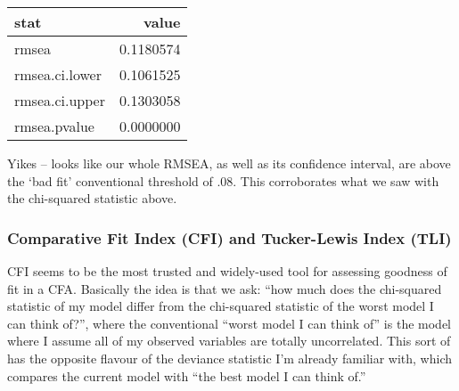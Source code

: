 \documentclass[
  letterpaper,
  DIV=11,
  numbers=noendperiod]{scrreprt}
\newenvironment{Shaded}{\begin{snugshade}}{\end{snugshade}}
\newcommand{\AttributeTok}[1]{\textcolor[rgb]{0.40,0.45,0.13}{#1}}
\newcommand{\CommentTok}[1]{\textcolor[rgb]{0.37,0.37,0.37}{#1}}
\newcommand{\FunctionTok}[1]{\textcolor[rgb]{0.28,0.35,0.67}{#1}}
\newcommand{\NormalTok}[1]{\textcolor[rgb]{0.00,0.23,0.31}{#1}}
\newcommand{\SpecialCharTok}[1]{\textcolor[rgb]{0.37,0.37,0.37}{#1}}
\newcommand{\StringTok}[1]{\textcolor[rgb]{0.13,0.47,0.30}{#1}}
\begin{document}
\begin{Shaded}
\end{Shaded}

\begin{longtable}[]{@{}lr@{}}
\toprule()
stat & value \\
\midrule()
\endhead
rmsea & 0.1180574 \\
rmsea.ci.lower & 0.1061525 \\
rmsea.ci.upper & 0.1303058 \\
rmsea.pvalue & 0.0000000 \\
\bottomrule()
\end{longtable}

Yikes -- looks like our whole RMSEA, as well as its confidence interval,
are above the `bad fit' conventional threshold of .08. This corroborates
what we saw with the chi-squared statistic above.

\hypertarget{comparative-fit-index-cfi-and-tucker-lewis-index-tli}{%
\subsubsection{Comparative Fit Index (CFI) and Tucker-Lewis Index
(TLI)}\label{comparative-fit-index-cfi-and-tucker-lewis-index-tli}}

CFI seems to be the most trusted and widely-used tool for assessing
goodness of fit in a CFA. Basically the idea is that we ask: ``how much
does the chi-squared statistic of my model differ from the chi-squared
statistic of the worst model I can think of?'', where the conventional
``worst model I can think of'' is the model where I assume all of my
observed variables are totally uncorrelated. This sort of has the
opposite flavour of the deviance statistic I'm already familiar with,
which compares the current model with ``the best model I can think of.''
\end{document}
